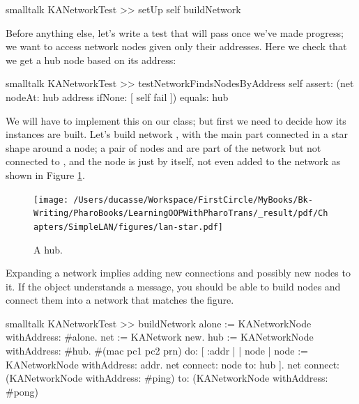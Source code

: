 \documentclass[10pt,twoside,english]{_support/latex/sbabook/sbabook}
\begin{document}
\begin{displaycode}{smalltalk}
KANetworkTest >> setUp
    self buildNetwork
\end{displaycode}

Before anything else, let's write a test that will pass once we've made progress; we want to access network nodes given only their addresses. Here we check that we get a hub node based on its address: 

\begin{displaycode}{smalltalk}
KANetworkTest >> testNetworkFindsNodesByAddress
    self
        assert: (net nodeAt: hub address ifNone: [ self fail ])
        equals: hub
\end{displaycode}

We will have to implement this  on our  class; but first we need to decide how its instances are built.
Let's build network , with the main part connected in a star shape around a  node; a pair of nodes  and  are part of the network but not connected to , and the  node is just by itself, not even added to the network as shown in Figure \ref{hub}.


\begin{figure}

\begin{center}
\texttt{[image: /Users/ducasse/Workspace/FirstCircle/MyBooks/Bk-Writing/PharoBooks/LearningOOPWithPharoTrans/\_result/pdf/Chapters/SimpleLAN/figures/lan-star.pdf]}\caption{A hub.\label{hub}}\end{center}
\end{figure}


Expanding a network implies adding new connections and possibly new nodes to it.
If the  object understands a  message, you should be able to build nodes and connect them into a network that matches the figure.

\begin{displaycode}{smalltalk}
KANetworkTest >> buildNetwork
	alone := KANetworkNode withAddress: #alone.
	net := KANetwork new.
	hub := KANetworkNode withAddress: #hub.
	#(mac pc1 pc2 prn)
		do: [ :addr | 
			| node |
			node := KANetworkNode withAddress: addr.
			net connect: node to: hub ].
	net connect: (KANetworkNode withAddress: #ping) to: (KANetworkNode withAddress: #pong)
\end{displaycode}
\end{document}
